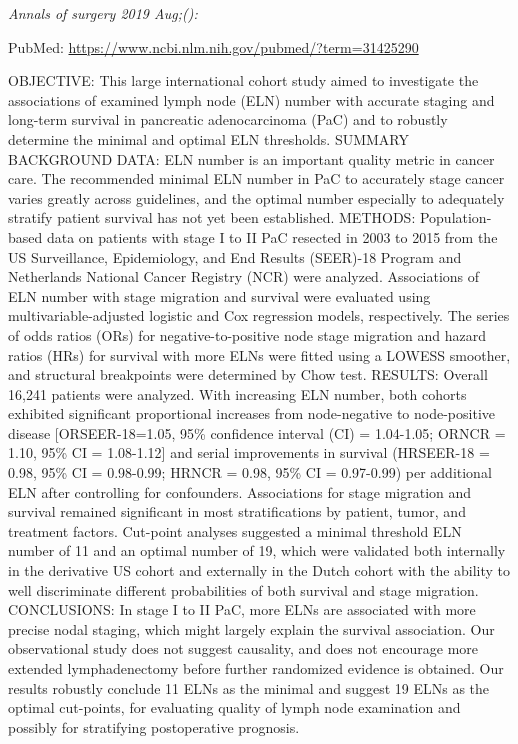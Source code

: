 \documentclass[]{article}
\begin{document}
\emph{Annals of surgery 2019 Aug;():}

PubMed: \url{https://www.ncbi.nlm.nih.gov/pubmed/?term=31425290}

OBJECTIVE: This large international cohort study aimed to investigate
the associations of examined lymph node (ELN) number with accurate
staging and long-term survival in pancreatic adenocarcinoma (PaC) and to
robustly determine the minimal and optimal ELN thresholds. SUMMARY
BACKGROUND DATA: ELN number is an important quality metric in cancer
care. The recommended minimal ELN number in PaC to accurately stage
cancer varies greatly across guidelines, and the optimal number
especially to adequately stratify patient survival has not yet been
established. METHODS: Population-based data on patients with stage I to
II PaC resected in 2003 to 2015 from the US Surveillance, Epidemiology,
and End Results (SEER)-18 Program and Netherlands National Cancer
Registry (NCR) were analyzed. Associations of ELN number with stage
migration and survival were evaluated using multivariable-adjusted
logistic and Cox regression models, respectively. The series of odds
ratios (ORs) for negative-to-positive node stage migration and hazard
ratios (HRs) for survival with more ELNs were fitted using a LOWESS
smoother, and structural breakpoints were determined by Chow test.
RESULTS: Overall 16,241 patients were analyzed. With increasing ELN
number, both cohorts exhibited significant proportional increases from
node-negative to node-positive disease {[}ORSEER-18=1.05, 95\%
confidence interval (CI) = 1.04-1.05; ORNCR = 1.10, 95\% CI =
1.08-1.12{]} and serial improvements in survival (HRSEER-18 = 0.98, 95\%
CI = 0.98-0.99; HRNCR = 0.98, 95\% CI = 0.97-0.99) per additional ELN
after controlling for confounders. Associations for stage migration and
survival remained significant in most stratifications by patient, tumor,
and treatment factors. Cut-point analyses suggested a minimal threshold
ELN number of 11 and an optimal number of 19, which were validated both
internally in the derivative US cohort and externally in the Dutch
cohort with the ability to well discriminate different probabilities of
both survival and stage migration. CONCLUSIONS: In stage I to II PaC,
more ELNs are associated with more precise nodal staging, which might
largely explain the survival association. Our observational study does
not suggest causality, and does not encourage more extended
lymphadenectomy before further randomized evidence is obtained. Our
results robustly conclude 11 ELNs as the minimal and suggest 19 ELNs as
the optimal cut-points, for evaluating quality of lymph node examination
and possibly for stratifying postoperative prognosis.
\end{document}
